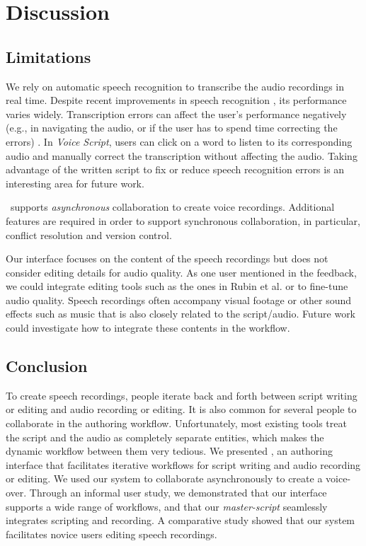 \section{Discussion}
\subsection{Limitations}
We rely on automatic speech recognition to transcribe the audio recordings in real time. Despite recent improvements in speech recognition \cite{hinton2012deep}, its performance varies widely. Transcription errors can affect the user's performance negatively (e.g., in navigating the audio, or if the user has to spend time correcting the errors) \cite{gaur2015effects}. In \textit{Voice Script}, users can click on a word to listen to its corresponding audio and manually correct the transcription without affecting the audio. Taking advantage of the written script to fix or reduce speech recognition errors is an interesting area for future work.

\voicescript\ supports \emph{asynchronous} collaboration to create voice recordings. Additional features are required in order to support synchronous collaboration, in particular, conflict resolution and version control. 

Our interface focuses on the content of the speech recordings but does not consider editing details for audio quality. As one user mentioned in the feedback, we could integrate editing tools such as the ones in Rubin et al. \cite{rubin2013content} or \cite{rubin2015capture} to fine-tune audio quality. Speech recordings often accompany visual footage or other sound effects such as music that is also closely related to the script/audio. Future work could investigate how to integrate these contents in the workflow.

\subsection{Conclusion}
To create speech recordings, people iterate back and forth between script writing or editing and audio recording or editing.  It is also common for several people to collaborate in the authoring workflow. Unfortunately, most existing tools treat the script and the audio as completely separate entities, which makes the dynamic workflow between them very tedious. We presented \voicescript, an authoring interface that facilitates iterative workflows for script writing and audio recording or editing. We used our system to collaborate asynchronously to create a voice-over. Through an informal user study, we demonstrated that our interface supports a wide range of workflows, and that our \textit{master-script} seamlessly integrates scripting and recording. A comparative study showed that our system facilitates novice users editing speech recordings. 


